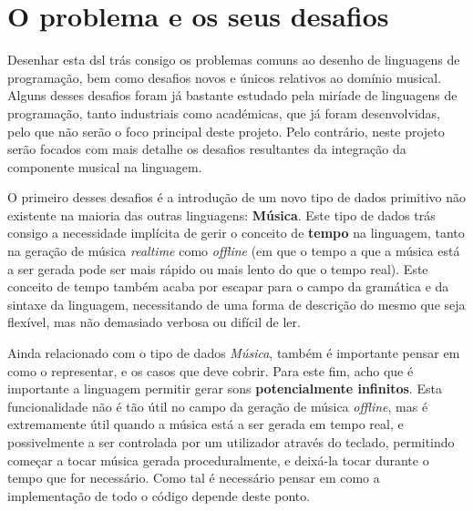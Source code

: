 \chapter{O problema e os seus desafios}
Desenhar esta \acrfull{dsl} trás consigo os problemas comuns ao desenho de linguagens de programação, bem como desafios novos e únicos relativos ao domínio musical. Alguns desses desafios foram já bastante estudado pela miríade de linguagens de programação, tanto industriais como académicas, que já foram desenvolvidas, pelo que não serão o foco principal deste projeto. Pelo contrário, neste projeto serão focados com mais detalhe os desafios resultantes da integração da componente musical na linguagem.


O primeiro desses desafios é a introdução de um novo tipo de dados primitivo não existente na maioria das outras linguagens: \textbf{Música}. Este tipo de dados trás consigo a necessidade implícita de gerir o conceito de \textbf{tempo} na linguagem, tanto na geração de música \textit{realtime} como \textit{offline} (em que o tempo a que a música está a ser gerada pode ser mais rápido ou mais lento do que o tempo real). Este conceito de tempo também acaba por escapar para o campo da gramática e da sintaxe da linguagem, necessitando de uma forma de descrição do mesmo que seja flexível, mas não demasiado verbosa ou difícil de ler.

Ainda relacionado com o tipo de dados \textit{Música}, também é importante pensar em como o representar, e os casos que deve cobrir. Para este fim, acho que é importante a linguagem permitir gerar sons \textbf{potencialmente infinitos}. Esta funcionalidade não é tão útil no campo da geração de música \textit{offline}, mas é extremamente útil quando a música está a ser gerada em tempo real, e possivelmente a ser controlada por um utilizador através do teclado, permitindo começar a tocar música gerada proceduralmente, e deixá-la tocar durante o tempo que for necessário. Como tal é necessário pensar em como a implementação de todo o código depende deste ponto.

